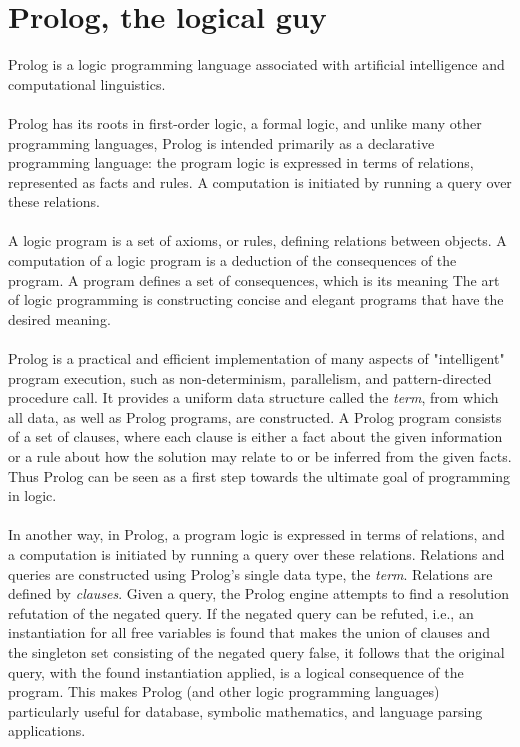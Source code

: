 \section{Prolog, the logical guy}
Prolog is a logic programming language associated with artificial intelligence and computational linguistics.\\\\
Prolog has its roots in first-order logic, a formal logic, and unlike many other programming languages, Prolog is intended primarily as a declarative programming language: the program logic is expressed in terms of relations, represented as facts and rules. A computation is initiated by running a query over these relations.\\\\
A logic program is a set of axioms, or rules, defining relations between objects. A computation of a logic program is a deduction of the consequences of the program. A program defines a set of consequences, which is its meaning The art of logic programming is constructing concise and elegant programs that have the desired meaning.\\\\
Prolog is a practical and efficient implementation of many aspects of "intelligent" program execution, such as non-determinism, parallelism, and pattern-directed procedure call. It provides a uniform data structure called the \textit{term}, from which all data, as well as Prolog programs, are constructed. A Prolog program consists of a set of clauses, where each clause is either a fact about the given information or a rule about how the solution may relate to or be inferred from the given facts. Thus Prolog can be seen as a first step towards the ultimate goal of programming in logic.\\\\
In another way, in Prolog, a program logic is expressed in terms of relations, and a computation is initiated by running a query over these relations. Relations and queries are constructed using Prolog's single data type, the \textit{term}. Relations are defined by \textit{clauses}. Given a query, the Prolog engine attempts to find a resolution refutation of the negated query. If the negated query can be refuted, i.e., an instantiation for all free variables is found that makes the union of clauses and the singleton set consisting of the negated query false, it follows that the original query, with the found instantiation applied, is a logical consequence of the program. This makes Prolog (and other logic programming languages) particularly useful for database, symbolic mathematics, and language parsing applications.
